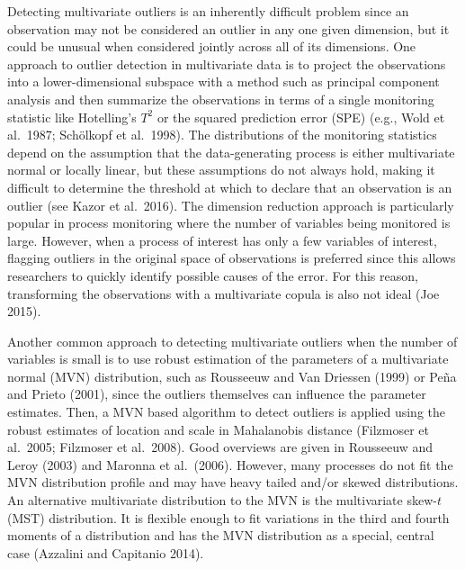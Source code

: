 \documentclass[12pt]{article}
\begin{document}
\begin{doublespacing}
Detecting multivariate outliers is an inherently difficult problem since an observation may not be considered an outlier in any one given dimension, but it could be unusual when considered jointly across all of its dimensions.   One approach to outlier detection in multivariate data is to project the observations into a lower-dimensional subspace with a method such as principal component analysis and then summarize the observations in terms of a single monitoring statistic like Hotelling's $T^2$ or the squared prediction error (SPE) (e.g., Wold et al.~1987; Sch\"{o}lkopf  et al.~1998). The distributions of the monitoring statistics depend on the assumption that the data-generating process is either multivariate normal or  locally linear, but these  assumptions do not always hold, making it difficult to determine the threshold at which to declare that an observation is an outlier  (see Kazor et al.~2016).  The dimension reduction approach is particularly popular in process monitoring where the number of variables being monitored is large.  However, when a process of interest has only a few variables of interest,  flagging outliers in the original space of observations is preferred since this allows researchers to quickly identify possible causes of the error.  For this reason, transforming the observations with a multivariate copula is also not ideal (Joe 2015).


Another  common approach to detecting multivariate outliers when the number of variables is small is to use  robust estimation of the parameters of a multivariate normal (MVN) distribution, such as Rousseeuw and Van Driessen (1999) or Pe\~{n}a and Prieto (2001),  since the outliers themselves can influence the parameter estimates.  Then, a  MVN based  algorithm to detect outliers is  applied using the robust estimates of location and scale in  Mahalanobis distance (Filzmoser et al.~2005; Filzmoser et al.~2008).  Good overviews are given in Rousseeuw and Leroy (2003) and Maronna et al.~(2006).  However, many processes do not fit the MVN distribution profile and may have heavy tailed and/or skewed distributions.  An alternative multivariate distribution to the MVN is the  multivariate skew-$t$ (MST) distribution.  It is flexible enough to fit  variations in the third and fourth moments of a distribution and has the MVN distribution as a special, central case (Azzalini and Capitanio 2014).


 



\end{doublespacing}
\end{document}
